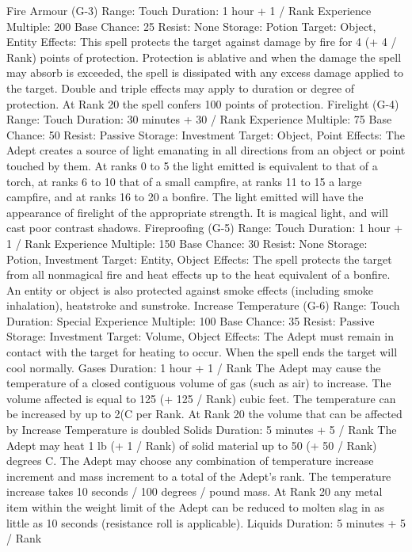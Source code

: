 \documentclass[a4paper]{article}
\begin{document}
\begin{multicols}{3}
Fire Armour (G-3)
Range: Touch
Duration: 1 hour + 1 / Rank
Experience Multiple: 200
Base Chance: 25%
Resist: None
Storage: Potion
Target: Object, Entity
Effects: This spell protects the target against damage by fire for 4 (+ 4 / Rank) points of protection.
Protection is ablative and when the damage the
spell may absorb is exceeded, the spell is dissipated with any excess damage applied to the target.
Double and triple effects may apply to duration or
degree of protection. At Rank 20 the spell confers
100 points of protection.
Firelight (G-4)
Range: Touch
Duration: 30 minutes + 30 / Rank
Experience Multiple: 75
Base Chance: 50%
Resist: Passive
Storage: Investment
Target: Object, Point
Effects: The Adept creates a source of light emanating in all directions from an object or point
touched by them. At ranks 0 to 5 the light emitted
is equivalent to that of a torch, at ranks 6 to 10 that
of a small campfire, at ranks 11 to 15 a large campfire, and at ranks 16 to 20 a bonfire. The light
emitted will have the appearance of firelight of the
appropriate strength. It is magical light, and will
cast poor contrast shadows.
Fireproofing (G-5)
Range: Touch
Duration: 1 hour + 1 / Rank
Experience Multiple: 150
Base Chance: 30%
Resist: None
Storage: Potion, Investment
Target: Entity, Object
Effects: The spell protects the target from all nonmagical fire and heat effects up to the heat equivalent of a bonfire. An entity or object is also protected against smoke effects (including smoke
inhalation), heatstroke and sunstroke.
Increase Temperature (G-6)
Range: Touch
Duration: Special
Experience Multiple: 100
Base Chance: 35%
Resist: Passive
Storage: Investment
Target: Volume, Object
Effects: The Adept must remain in contact with the
target for heating to occur. When the spell ends the
target will cool normally.
Gases
Duration: 1 hour + 1 / Rank
The Adept may cause the temperature of a closed
contiguous volume of gas (such as air) to increase.
The volume affected is equal to 125 (+ 125 / Rank)
cubic feet. The temperature can be increased by up
to 2(C per Rank. At Rank 20 the volume that can
be affected by Increase Temperature is doubled
Solids
Duration: 5 minutes + 5 / Rank
The Adept may heat 1 lb (+ 1 / Rank) of solid
material up to 50 (+ 50 / Rank) degrees C. The
Adept may choose any combination of temperature
increase increment and mass increment to a total of
the Adept’s rank. The temperature increase takes
10 seconds / 100 degrees / pound mass. At Rank 20
any metal item within the weight limit of the Adept
can be reduced to molten slag in as little as 10
seconds (resistance roll is applicable).
Liquids
Duration: 5 minutes + 5 / Rank


\end{multicols}
\end{document}

